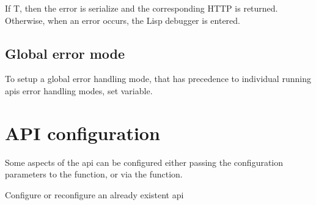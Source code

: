 \documentclass[letterpaper,10pt,english]{sphinxmanual}
\begin{document}
\begin{fulllineitems}
\label{\detokenize{error-handling:variable:rest-server:*catch-errors*}}
\end{fulllineitems}


If T, then the error is serialize and the corresponding HTTP is returned. Otherwise, when an error occurs, the Lisp debugger is entered.


\section{Global error mode}
\label{\detokenize{error-handling:global-error-mode}}
To setup a global error handling mode, that has precedence to individual running apis error handling modes, set {\hyperref[\detokenize{error-handling:variable:rest-server:*server-catch-errors*}]{}} variable.

\begin{fulllineitems}
\label{\detokenize{error-handling:variable:rest-server:*server-catch-errors*}}
\end{fulllineitems}



\chapter{API configuration}
\label{\detokenize{api-configuration:api-configuration}}\label{\detokenize{api-configuration::doc}}
Some aspects of the api can be configured either passing the configuration parameters to the {\hyperref[\detokenize{api:function:rest-server:start-api}]{}} function, or via the {\hyperref[\detokenize{api-configuration:function:rest-server:configure-api}]{}} function.

\begin{fulllineitems}
\label{\detokenize{api-configuration:function:rest-server:configure-api}}
Configure or reconfigure an already existent api

\end{fulllineitems}
\end{document}
